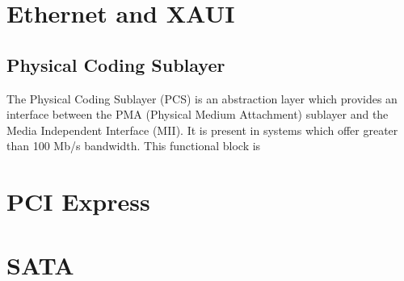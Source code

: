 \documentclass[12pt]{article}
\begin{document}
\section{Ethernet and XAUI}
\subsection{Physical Coding Sublayer}
The Physical Coding Sublayer (PCS) is an abstraction layer which provides an
interface between the PMA (Physical Medium Attachment) sublayer and the Media
Independent Interface (MII). It is present in systems which offer greater than
100 Mb/s bandwidth. This functional block is 

\section{PCI Express}
\section{SATA}
\end{document}
